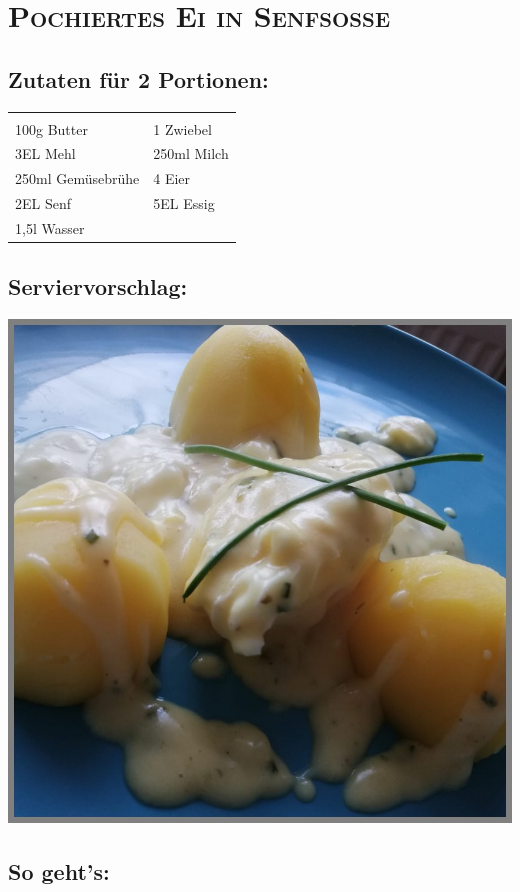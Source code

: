\section{\textsc{Pochiertes Ei in Senfsoße}}

\subsection*{Zutaten für 2 Portionen:}

\begin{tabular}{p{7.5cm} p{7.5cm}}
	& \\
	100g Butter & 1 Zwiebel \\
	3EL Mehl & 250ml Milch \\
  250ml Gemüsebrühe & 4 Eier \\
  2EL Senf & 5EL Essig \\
  1,5l Wasser &
\end{tabular}

\subsection*{Serviervorschlag:}

\includegraphics[width=\textwidth]{img/pohiertes_senfei.jpeg} \cite{eisenfsosse}

\subsection*{So geht's:}


